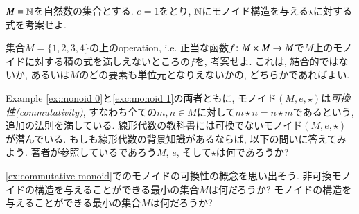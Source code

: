 \begin{exercise}\label{exc:monoid 1}
$M={\mathbb N}$を自然数の集合とする. $e=1$をとり, ${\mathbb N}$にモノイド構造を与える$\star$に対する式を考案せよ.
\end{exercise}

\begin{exercise}
集合$M=\{1,2,3,4\}$の上のoperation, i.e. 正当な函数$f\colon M\times M\rightarrow M$で$M$上のモノイドに対する積の式を満しえないところの$f$を, 考案せよ. これは, 結合的ではないか, あるいは$M$のどの要素も単位元となりえないかの, どちらかであればよい.
\end{exercise}

\begin{exercise}\label{ex:commutative monoid}
Example \ref{ex:monoid 0}と\ref{exc:monoid 1}の両者ともに, モノイド$(M,e,\star)$は\emph{可換性(commutativity)}, すなわち全ての$m,n\in M$に対して$m\star n=n\star m$であるという, 追加の法則を満している. 線形代数の教科書には可換でないモノイド$(M,e,\star)$が潜んでいる. もしも線形代数の背景知識があるならば, 以下の問いに答えてみよう. 著者が参照しているであろう$M$, $e$, そして$\star$は何であろうか?
\end{exercise}

\begin{exercise}
\ref{ex:commutative monoid}でのモノイドの可換性の概念を思い出そう.
\sexc 非可換モノイドの構造を与えることができる最小の集合$M$は何だろうか?
\next モノイドの構造を与えることができる最小の集合$M$は何だろうか?
\endsexc
\end{exercise}

